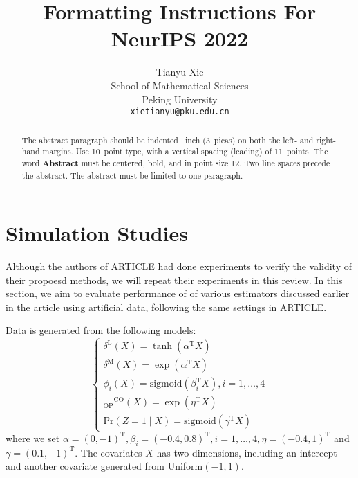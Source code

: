 \documentclass{article}
\title{Formatting Instructions For NeurIPS 2022}
\author{%
  Tianyu Xie \\
  School of Mathematical Sciences\\
  Peking University\\
  \texttt{xietianyu@pku.edu.cn} \\
}
\begin{document}
\maketitle


\begin{abstract}
  The abstract paragraph should be indented ~inch (3~picas) on
  both the left- and right-hand margins. Use 10~point type, with a vertical
  spacing (leading) of 11~points.  The word \textbf{Abstract} must be centered,
  bold, and in point size 12. Two line spaces precede the abstract. The abstract
  must be limited to one paragraph.
\end{abstract}



\section{Simulation Studies}
Although the authors of ARTICLE had done experiments to verify the validity of their propoesd methods, we will repeat their experiments in this review. In this section, we aim to evaluate performance of of various estimators discussed earlier in the article using artificial data, following the same settings in ARTICLE.

Data is generated from the following models:
\begin{equation}\label{generate}
\left\{
\begin{array}{l}
\delta^{\mathrm{L}}(X) =\tanh \left(\alpha^{\mathrm{T}} X\right)\\
\delta^{\mathrm{M}}(X) =\exp \left(\alpha^{\mathrm{T}} X\right) \\
\phi_{i}(X) =\mathrm{sigmoid}\left(\beta_{i}^{\mathrm{T}} X\right), i=1, \ldots, 4\\
{ }_{\mathrm{OP}}{ }^{\mathrm{CO}}(X) =\exp \left(\eta^{\mathrm{T}} X\right) \\
\mathrm{Pr}(Z=1 \mid X) =\mathrm{sigmoid}\left(\gamma^{\mathrm{T}} X\right)
\end{array}
\right.
\end{equation}
where we set $\alpha=(0,-1)^{\mathrm{T}}, \beta_{i}=(-0.4,0.8)^{\mathrm{T}},i=1, \ldots, 4, \eta=(-0.4,1)^{\mathrm{T}}$ and $\gamma=(0.1,-1)^{\mathrm{T}}$. The covariates $X$ has two dimensions, including an intercept and another covariate generated from Uniform$(-1,1)$.
\end{document}
